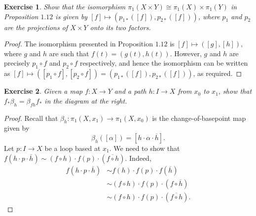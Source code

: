 \documentclass{article}
\newtheorem{exercise}{Exercise}[subsection]
\begin{document}
\begin{exercise}
Show that the isomorphism $\pi_1(X\times Y)\cong\pi_1(X)\times\pi_1(Y)$ in Proposition $1.12$ is given by $[f]\mapsto(p_{1*}([f]),p_{2*}([f]))$, where $p_1$ and $p_2$ are the projections of $X\times Y$ onto its two factors.
\end{exercise}
\begin{proof}
The isomorphism presented in Proposition $1.12$ is $[f]\mapsto([g],[h])$, where $g$ and $h$ are such that $f(t)=(g(t),h(t))$. However, $g$ and $h$ are precisely $p_1\circ f$ and $p_2\circ f$ respectively, and hence the isomorphism can be written as $[f]\mapsto([p_1\circ f],[p_2\circ f])=(p_{1*}([f]),p_{2*}([f]))$, as required.
\end{proof}
\begin{exercise}
Given a map $f:X\to Y$ and a path $h:I\to X$ from $x_0$ to $x_1$, show that $f_*\beta_h=\beta_{fh}f_*$ in the diagram at the right. 
\end{exercise}
\begin{proof}
Recall that $\beta_h:\pi_1(X,x_1)\to\pi_1(X,x_0)$ is the change-of-basepoint map given by \[\beta_h([\alpha])=[h\cdot \alpha\cdot \overline{h}].\] Let $p:I\to X$ be a loop based at $x_1$. We need to show that $f(h\cdot p\cdot\overline{h})\sim (f\circ h)\cdot f(p)\cdot(\overline{f\circ h})$. Indeed,\begin{align*}
    f(h\cdot p\cdot\overline{h})&\sim f(h)\cdot f(p)\cdot f(\overline{h})\\&\sim(f\circ h)\cdot f(p)\cdot(f\circ\overline{h})\\&\sim(f\circ h)\cdot f(p)\cdot(\overline{f\circ h}).
\end{align*}
\end{proof}
\end{document}
